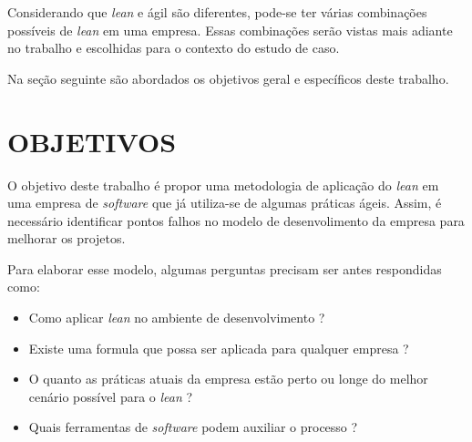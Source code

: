 Considerando que \textit{lean} e ágil são diferentes, pode-se ter várias combinações possíveis de \textit{lean} em uma empresa. Essas combinações serão vistas mais adiante no trabalho e escolhidas para o contexto do estudo de caso.



Na seção seguinte são abordados os objetivos geral e específicos deste trabalho.

\section{OBJETIVOS}

O objetivo deste trabalho é propor uma metodologia de aplicação do \textit{lean} em uma empresa de \textit{software} que já utiliza-se de algumas práticas ágeis. Assim, é necessário identificar pontos falhos no modelo de desenvolimento da empresa para melhorar os projetos.

Para elaborar esse modelo, algumas perguntas precisam ser antes respondidas como:

\begin{itemize}
	\item Como aplicar \textit{lean} no ambiente de desenvolvimento ?
	\item Existe uma formula que possa ser aplicada para qualquer empresa ?
	\item O quanto as práticas atuais da empresa estão perto ou longe do melhor cenário possível para o \textit{lean} ?
	\item Quais ferramentas de \textit{software} podem auxiliar o processo ?
\end{itemize}

